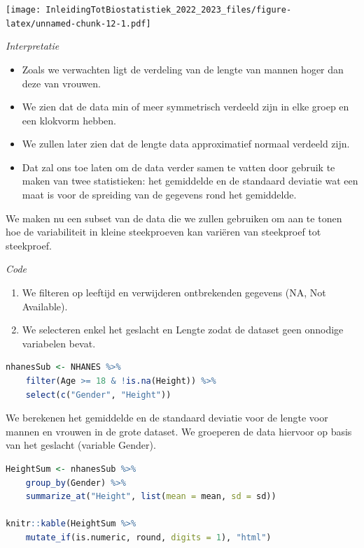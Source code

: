 \documentclass[
  12pt,dutch,coursenotes]{book}
\providecommand{\tightlist}{%
  \setlength{\itemsep}{0pt}\setlength{\parskip}{0pt}}
\begin{document}
\texttt{[image: InleidingTotBiostatistiek\_2022\_2023\_files/figure-latex/unnamed-chunk-12-1.pdf]}

\emph{Interpretatie}

\begin{itemize}
\tightlist
\item
  Zoals we verwachten ligt de verdeling van de lengte van mannen hoger dan deze van vrouwen.
\item
  We zien dat de data min of meer symmetrisch verdeeld zijn in elke groep en een klokvorm hebben.
\item
  We zullen later zien dat de lengte data approximatief normaal verdeeld zijn.
\item
  Dat zal ons toe laten om de data verder samen te vatten door gebruik te maken van twee statistieken: het gemiddelde en de standaard deviatie wat een maat is voor de spreiding van de gegevens rond het gemiddelde.
\end{itemize}

We maken nu een subset van de data die we zullen gebruiken om aan te tonen hoe de variabiliteit in kleine steekproeven kan variëren van steekproef tot steekproef.

\emph{Code}

\begin{enumerate}
\def\labelenumi{\arabic{enumi}.}
\tightlist
\item
  We filteren op leeftijd en verwijderen ontbrekenden gegevens (NA, Not Available).
\item
  We selecteren enkel het geslacht en Lengte zodat de dataset geen onnodige variabelen bevat.
\end{enumerate}

\begin{lstlisting}[language=R]
nhanesSub <- NHANES %>%
    filter(Age >= 18 & !is.na(Height)) %>%
    select(c("Gender", "Height"))
\end{lstlisting}

We berekenen het gemiddelde en de standaard deviatie voor de lengte voor mannen en vrouwen in de grote dataset.
We groeperen de data hiervoor op basis van het geslacht (variable Gender).

\begin{lstlisting}[language=R]
HeightSum <- nhanesSub %>%
    group_by(Gender) %>%
    summarize_at("Height", list(mean = mean, sd = sd))

knitr::kable(HeightSum %>%
    mutate_if(is.numeric, round, digits = 1), "html")
\end{lstlisting}
\end{document}
